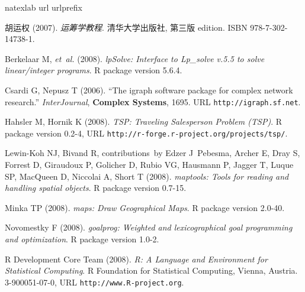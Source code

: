 \documentclass{article}
\begin{document}


\begin{thebibliography}{20}
\newcommand{\enquote}[1]{``#1''}
\expandafter\ifx\csname natexlab\endcsname\relax\def\natexlab#1{#1}\fi
\expandafter\ifx\csname url\endcsname\relax
  \def\url#1{\texttt{#1}}\fi
\expandafter\ifx\csname urlprefix\endcsname\relax\def\urlprefix{URL }\fi
\providecommand{\eprint}[2][]{\url{#2}}

胡运权 (2007).
\newblock \emph{运筹学教程}.
\newblock 清华大学出版社, 第三版 edition.
\newblock ISBN 978-7-302-14738-1.

Berkelaar M, \emph{et~al.} (2008).
\newblock \emph{lpSolve: Interface to Lp\_solve v.5.5 to solve linear/integer
  programs}.
\newblock R package version 5.6.4.

Csardi G, Nepusz T (2006).
\newblock \enquote{The igraph software package for complex network research.}
\newblock \emph{InterJournal}, \textbf{Complex Systems}, 1695.
\newblock \urlprefix\url{http://igraph.sf.net}.

Hahsler M, Hornik K (2008).
\newblock \emph{TSP: Traveling Salesperson Problem (TSP)}.
\newblock R package version 0.2-4,
  \urlprefix\url{http://r-forge.r-project.org/projects/tsp/}.

Lewin-Koh NJ, Bivand R, contributions~by Edzer J~Pebesma, Archer E, Dray S,
  Forrest D, Giraudoux P, Golicher D, Rubio VG, Hausmann P, Jagger T, Luque SP,
  MacQueen D, Niccolai A, Short T (2008).
\newblock \emph{maptools: Tools for reading and handling spatial objects}.
\newblock R package version 0.7-15.

Minka TP (2008).
\newblock \emph{maps: Draw Geographical Maps}.
\newblock R package version 2.0-40.

Novomestky F (2008).
\newblock \emph{goalprog: Weighted and lexicographical goal programming and
  optimization}.
\newblock R package version 1.0-2.

{R Development Core Team} (2008).
\newblock \emph{R: A Language and Environment for Statistical Computing}.
\newblock R Foundation for Statistical Computing, Vienna, Austria.
 3-900051-07-0, \urlprefix\url{http://www.R-project.org}.


\end{thebibliography}
\end{document}
